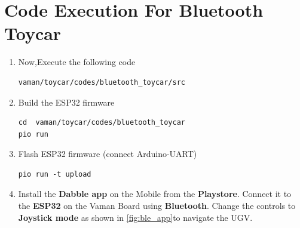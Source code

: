 \section{Code Execution For Bluetooth Toycar}
\begin{enumerate}[resume]
\item Now,Execute the following code
\begin{lstlisting}
vaman/toycar/codes/bluetooth_toycar/src
\end{lstlisting}

\item Build the ESP32 firmware
\begin{lstlisting}
cd  vaman/toycar/codes/bluetooth_toycar
pio run
\end{lstlisting} 

\item Flash ESP32 firmware (connect Arduino-UART)
\begin{lstlisting}
pio run -t upload
\end{lstlisting} 
\item Install the \textbf{Dabble app} on the Mobile from the \textbf{Playstore}. Connect it to the \textbf{ESP32} on the Vaman Board using \textbf{Bluetooth}. Change the controls to \textbf{Joystick mode} as shown in \autoref{fig:ble_app}to navigate the UGV.\\
\end{enumerate}

